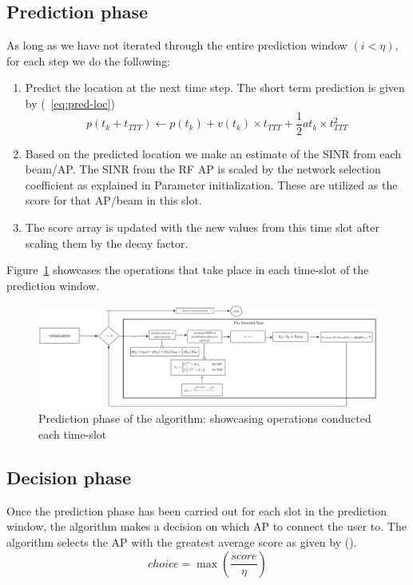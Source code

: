 \subsection{Prediction phase}
As long as we have not iterated through the entire prediction window $(i < \eta)$, for each step we do the following:
\begin{enumerate}
    \item Predict the location at the next time step. The short term prediction is given by (~\ref{eq:pred-loc})
    \begin{equation}
        p(t_k + t_{TTT}) \leftarrow p(t_k) + v(t_k) \times t_{TTT} + \frac{1}{2}a{t_k} \times t_{TTT}^2
        \label{eq:pred-loc}
    \end{equation}
    \item Based on the predicted location we make an estimate of the SINR from each beam/AP. The SINR from the RF AP is scaled by the network selection coefficient as explained in Parameter initialization. These are utilized as the score for that AP/beam in this slot.
    \item The score array is updated with the new values from this time slot after scaling them by the decay factor.
\end{enumerate}
Figure~\ref{fig:algo-prediction} showcases the operations that take place in each time-slot of the prediction window.
\begin{figure}
    \centering
    \includegraphics[width=1\linewidth]{Figures/algorithm-prediction-phase.png}
    \caption{Prediction phase of the algorithm: showcasing operations conducted each time-slot}
    \label{fig:algo-prediction}
\end{figure}
\subsection{Decision phase}
Once the prediction phase has been carried out for each slot in the prediction window, the algorithm makes a decision on which AP to connect the user to. The algorithm selects the AP with the greatest average score as given by ().
\begin{equation}
        {choice} = \max(\frac{score}{\eta})
        \label{eq:algo-decide}
    \end{equation}


